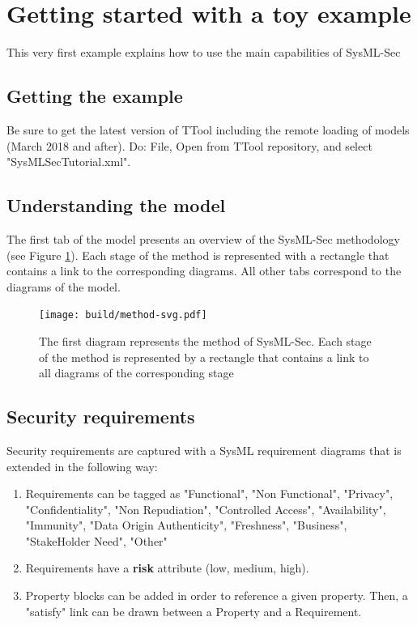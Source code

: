 \documentclass[12pt]{article}
\begin{document}
\newpage
\section{Getting started with a toy example}\label{sec:example}
This very first example explains how to use the main capabilities of SysML-Sec

\subsection{Getting the example}
Be sure to get the latest version of TTool including the remote loading of models (March 2018 and after). Do: File, Open from TTool repository, and select "SysMLSecTutorial.xml".

\subsection{Understanding the model}
The first tab of the model presents an overview of the SysML-Sec methodology (see Figure \ref{fig:method}). Each stage of the method is represented with a rectangle that contains a link to the corresponding diagrams.  All other tabs correspond to the diagrams of the model.


\begin{figure}[htbp]
\centering
\texttt{[image: build/method-svg.pdf]}

\caption{The first diagram represents the method of SysML-Sec. Each stage of the method is represented by a rectangle that contains a link to all diagrams of the corresponding stage} \label{fig:method}
\end{figure}

\subsection{Security requirements}
Security requirements are captured with a SysML requirement diagrams that is extended in the following way:
\begin{enumerate}
\item Requirements can be tagged as "Functional", "Non Functional", "Privacy", "Confidentiality", "Non Repudiation", "Controlled Access", "Availability", "Immunity", "Data Origin Authenticity", "Freshness", "Business", "StakeHolder Need", "Other"
\item Requirements have a \textbf{risk} attribute (low, medium, high).
\item Property blocks can be added in order to reference a given property. Then, a "satisfy" link can be drawn between a Property and a Requirement.
\end{enumerate}
\end{document}
